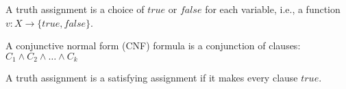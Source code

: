 \begin{definition}
A truth assignment is a choice of $\mathit{true}$ or $\mathit{false}$ for each variable, i.e., a function $v : X \rightarrow \{true, false\}$.
\end{definition}

\begin{definition}
A conjunctive normal form (CNF) formula is a conjunction of clauses:
$C_1 \wedge C_2 \wedge \ldots \wedge C_k$
\end{definition}

\begin{definition}
A truth assignment is a satisfying assignment if it makes every clause $true$.
\end{definition}

%


